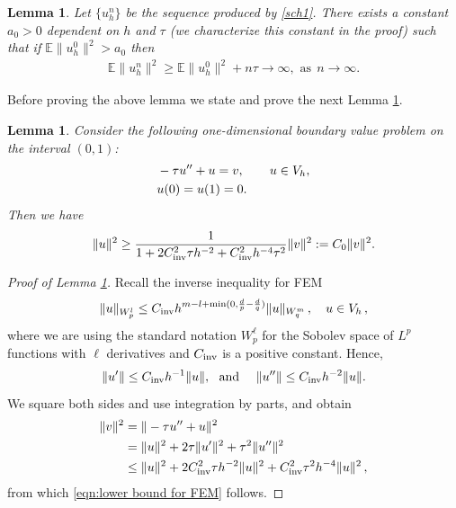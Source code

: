 \documentclass[reqno, 11pt]{amsart}
\theoremstyle{plain}
\newtheorem{lemma}[theorem]{Lemma}
\theoremstyle{definition}
\theoremstyle{remark}
\numberwithin{equation}{section}
\numberwithin{theorem}{section}
\begin{document}
{ 
\begin{lemma}\label{lemma: Can explosion lemma}
 Let $\{u_h^n\}$ be the sequence produced by \eqref{sch1}. There exists a constant $a_0>0$ dependent on $h$ and $\tau$ (we characterize this constant in the proof) such that if $\mathbb E{\|u_h^0\|^2} > a_0$ then 
 \begin{align}\label{eqn: explosion of euler scheme}
\mathbb{E}\|u_h^n\|^2\geq\mathbb{E}\|u_h^0\|^2+n\tau \to \infty, \text{ as} \ \ n\to\infty.
 \end{align}
 \end{lemma}
Before proving the above lemma we state and prove the next Lemma \ref{lemma: auxiliary lemma}.  
\begin{lemma}\label{lemma: auxiliary lemma}
Consider the following one-dimensional boundary value problem on the interval $(0,1)$: 
\begin{align}
&-\tau u''+u=v, \qquad u\in V_h, \notag\\
&u(0)=u(1)=0. 
\end{align}
Then we have 
 \begin{align}\label{eqn:lower bound for FEM}
 \|u\|^2\geq \frac{1}{1+2C_{\rm inv}^2\tau h^{-2}+C_{\rm inv}^2h^{-4}\tau^2}\|v\|^2:=C_0\|v\|^2.
 \end{align}
\end{lemma} 
 \begin{proof}[Proof of Lemma \ref{lemma: auxiliary lemma}]
 Recall the inverse inequality for FEM \cite[section 4.5]{Brenner}
 $$
 \|u\|_{W_p^l}\leq C_{\rm inv}h^{m-l+\min(0, \frac{d}{p}-\frac{d}{q})}\|u\|_{W_q^m}\,, \quad u \in V_h\, ,
 $$
 where  we are using the standard notation $W_p^\ell$ for the Sobolev space of $L^p$ functions with $\ell$ derivatives and $C_{\rm inv}$ is a positive constant. 
 Hence, 
 $$
 \|u'\|\leq C_{\rm inv}h^{-1}\|u\|, \ \ \text{and} \ \ \ \ \|u''\|\leq C_{\rm inv}h^{-2}\|u\|.
 $$
 We square both sides and use integration by parts, and obtain
 \begin{align*}
 \|v\|^2&=\|-\tau u''+u\|^2\\
 &=\|u\|^2+2\tau\|u'\|^2+\tau^2\|u''\|^2 \\
 &\leq \|u\|^2+2C_{\rm inv}^2\tau h^{-2}\|u\|^2+C_{\rm inv}^2\tau^2h^{-4}\|u\|^2 \, ,
 \end{align*}
 from which \eqref{eqn:lower bound for FEM} follows. 
 \end{proof}
 
}
\end{document}

